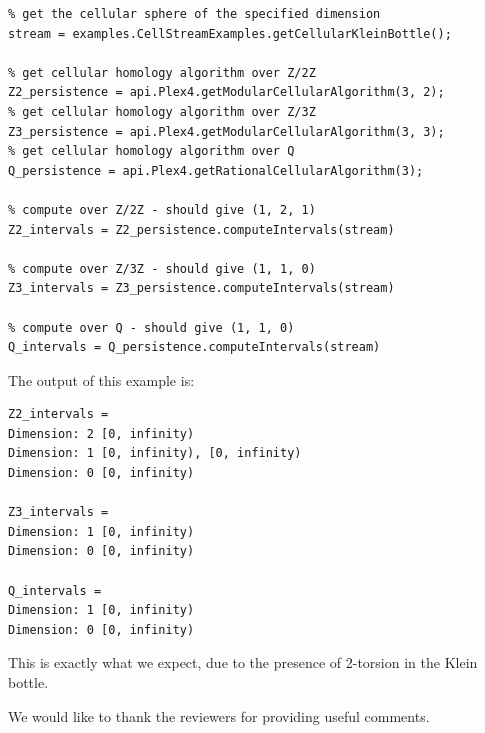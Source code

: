 \documentclass{gts2012}
\begin{document}
\begin{verbatim}
% get the cellular sphere of the specified dimension
stream = examples.CellStreamExamples.getCellularKleinBottle();

% get cellular homology algorithm over Z/2Z
Z2_persistence = api.Plex4.getModularCellularAlgorithm(3, 2);
% get cellular homology algorithm over Z/3Z
Z3_persistence = api.Plex4.getModularCellularAlgorithm(3, 3);
% get cellular homology algorithm over Q
Q_persistence = api.Plex4.getRationalCellularAlgorithm(3);

% compute over Z/2Z - should give (1, 2, 1)
Z2_intervals = Z2_persistence.computeIntervals(stream)

% compute over Z/3Z - should give (1, 1, 0)
Z3_intervals = Z3_persistence.computeIntervals(stream)

% compute over Q - should give (1, 1, 0)
Q_intervals = Q_persistence.computeIntervals(stream)
\end{verbatim}
The output of this example is:
\begin{verbatim}
Z2_intervals =
Dimension: 2 [0, infinity)
Dimension: 1 [0, infinity), [0, infinity)
Dimension: 0 [0, infinity)
  
Z3_intervals =
Dimension: 1 [0, infinity)
Dimension: 0 [0, infinity)
 
Q_intervals =
Dimension: 1 [0, infinity)
Dimension: 0 [0, infinity)
\end{verbatim}
This is exactly what we expect, due to the presence of 2-torsion in the Klein bottle.



\begin{acknowledgments}
We would like to thank the reviewers for providing useful comments.
\end{acknowledgments}




\footnotesize 

\end{document}
